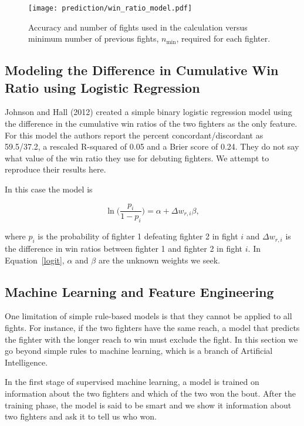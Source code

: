 \begin{figure}[h]
\begin{center}
\texttt{[image: prediction/win\_ratio\_model.pdf]}
\caption{Accuracy and number of fights used in the calculation
versus minimum number of previous fights, $n_{\textrm{min}}$, required for each fighter.}
\label{win_ratio_wins}
\end{center}
\end{figure}

\clearpage
\subsection*{Modeling the Difference in Cumulative Win Ratio using Logistic Regression}
Johnson and Hall (2012) created a simple binary logistic regression model using
the difference in the cumulative win ratios of the two fighters as the only feature.
For this model the authors report the percent concordant/discordant as 59.5/37.2, a
rescaled R-squared of 0.05 and a Brier score of 0.24. They do not say what value of the
win ratio they use for debuting fighters.
We attempt to reproduce their results here.

In this case the model is

\begin{equation}
\ln\Bigg ( \frac{p_i}{1-p_i} \Bigg) = \alpha + \Delta w_{r,i} \beta,
\label{logit}
\end{equation}

\noindent
where $p_i$ is the probability of fighter 1 defeating fighter 2 in fight $i$ and
$\Delta w_{r,i}$ is the difference in win ratios between fighter 1 and fighter 2 in fight $i$.
In Equation~\ref{logit}, $\alpha$ and $\beta$ are the unknown weights we seek.


\clearpage
\subsection*{Machine Learning and Feature Engineering}

One limitation of simple rule-based models is that they
cannot be applied to all fights. For instance, if the two fighters
have the same reach, a model that predicts the fighter with the longer
reach to win must exclude the fight.
In this section we go beyond simple rules to machine learning,
which is a branch of Artificial Intelligence.

In the first stage of supervised machine learning, a model
is trained on information about the two fighters
and which of the two won the bout. After the training phase,
the model is said to be smart and we show it information about
two fighters and ask it to tell us who won.

